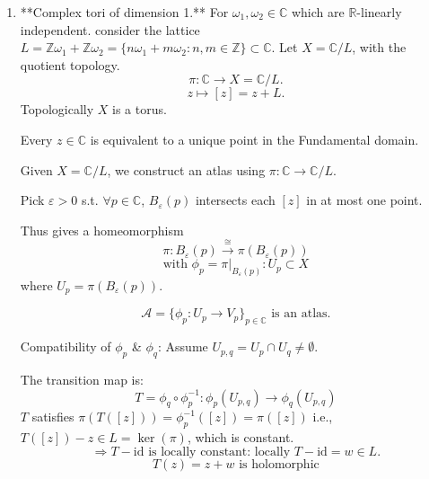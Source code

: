 \documentclass{article}
\begin{document}
\begin{enumerate}
    \item **Complex tori of dimension 1.**
    For $\omega_1, \omega_2 \in \mathbb{C}$ which are $\mathbb{R}$-linearly independent. consider the lattice $L = \mathbb{Z}\omega_1 + \mathbb{Z}\omega_2 = \{ n\omega_1 + m\omega_2 : n, m \in \mathbb{Z} \} \subset \mathbb{C}$.
    Let $X = \mathbb{C}/L$, with the quotient topology.
$$
\pi : \mathbb{C} \longrightarrow X = \mathbb{C}/L.
$$
$$
z \longmapsto [z] = z+L.
$$
Topologically $X$ is a torus.

Every $z \in \mathbb{C}$ is equivalent to a unique point in the
Fundamental domain.

\begin{center}
\end{center}

Given $X = \mathbb{C}/L$, we construct an atlas using $\pi : \mathbb{C} \to \mathbb{C}/L$.

Pick $\varepsilon > 0$ s.t. $\forall p \in \mathbb{C}$, $B_{\varepsilon}(p)$ intersects each $[z]$ in at most one point.

Thus gives a homeomorphism
$$
\pi : B_{\varepsilon}(p) \xrightarrow{\cong} \pi(B_{\varepsilon}(p))
$$
$$
\text{with } \phi_p = \pi \big|_{B_{\varepsilon}(p)} : U_p \subset X
$$
where $U_p = \pi(B_{\varepsilon}(p))$.

\begin{claim*}
$$
\mathcal{A} = \{ \phi_p : U_p \to V_p \}_{p \in \mathbb{C}} \text{ is an atlas.}
$$
\end{claim*}
Compatibility of $\phi_p$ \& $\phi_q$:
Assume $U_{p, q} = U_p \cap U_q \neq \emptyset$.

The transition map is:
$$
T = \phi_q \circ \phi_p^{-1} : \phi_p(U_{p, q}) \longrightarrow \phi_q(U_{p, q})
$$
$T$ satisfies $\pi(T([z])) = \phi_p^{-1}([z]) = \pi([z])$ i.e., $T([z])-z \in L = \ker(\pi)$, which is constant.
$$
\Rightarrow T - \mathrm{id} \text{ is locally constant: locally } T - \mathrm{id} = w \in L.
$$
$$
T(z) = z + w \text{ is holomorphic}
$$
\end{enumerate}
\end{document}
